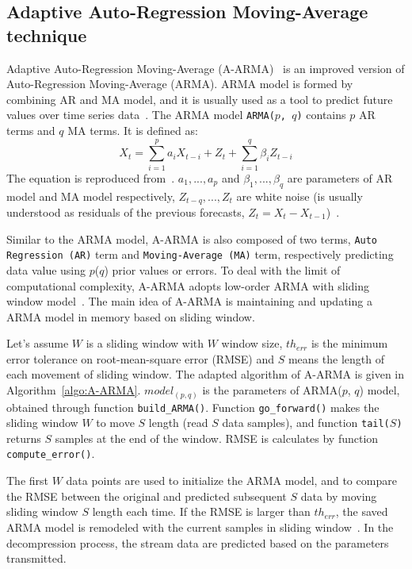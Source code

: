 \subsection{Adaptive Auto-Regression Moving-Average technique}


Adaptive Auto-Regression Moving-Average (A-ARMA)~\cite{lu2010optimized} is an
improved version of Auto-Regression Moving-Average (ARMA). ARMA model is formed
by combining AR and MA model, and it is usually used as a tool to predict future
values over time series data~\cite{chatfield2016analysis}. The ARMA model
\texttt{ARMA($p$, $q$)} contains $p$ AR terms and $q$ MA terms. It is defined
as:
\begin{equation}
X_t = \sum_{i=1}^{p}a_{i}X_{t-i} + Z_t + \sum_{i=1}^{q}\beta_{i}Z_{t-i}
\end{equation}
\noindent The equation is reproduced from~\cite{chatfield2016analysis}. 
$a_1, ..., a_p$ and $\beta_1, ..., \beta_q$ are parameters of AR model and MA
model respectively, $Z_{t-q}, ...,Z_{t}$ are white noise (is usually understood
as residuals of the previous forecasts, $Z_t = X_t -
X_{t-1}$)~\cite{chatfield2016analysis}.

Similar to the ARMA model, A-ARMA is also composed of
two terms, \texttt{Auto Regression (AR)} term and \texttt{Moving-Average (MA)}
term, respectively predicting data value using $p$($q$) prior values or errors. 
To deal with the limit of computational complexity, A-ARMA adopts low-order ARMA
with sliding window model~\cite{lu2010optimized}. The main idea of A-ARMA is
maintaining and updating a ARMA model in memory based on sliding window. 

Let's assume $W$ is a sliding window with $W$ window size, $th_{err}$ is the
minimum error tolerance on root-mean-square error (RMSE) and $S$ means the
length of each movement of sliding window. The adapted algorithm of A-ARMA is
given in Algorithm~\ref{algo:A-ARMA}. $model_{(p, q)}$ is the parameters of
ARMA($p$, $q$) model, obtained through function \texttt{build\_ARMA()}.
Function \texttt{go\_forward()} makes the sliding window $W$ to move $S$ length
(read $S$ data samples), and function \texttt{tail($S$)} returns $S$ samples at
the end of the window. RMSE is calculates by function \texttt{compute\_error()}.

The first $W$ data points are used to initialize the ARMA model, and to compare
the RMSE between the original and predicted subsequent $S$ data by moving
sliding window $S$ length each time. If the RMSE is larger than $th_{err}$, the
saved ARMA model is remodeled with the current samples in sliding
window~\cite{lu2010optimized}. In the decompression process, the stream data are
predicted based on the parameters transmitted.

